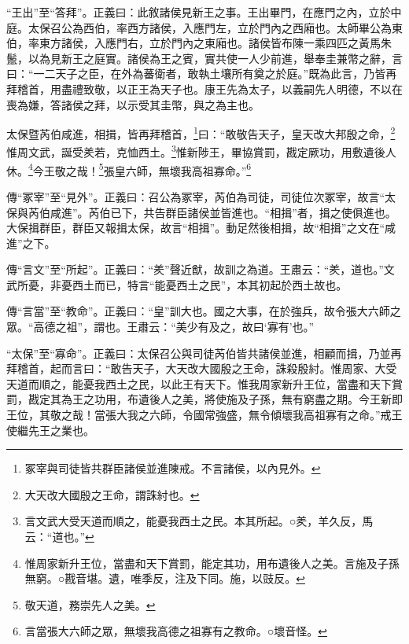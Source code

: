 {\noindent\shu{}\fzkt “王出”至“答拜”。正義曰：此敘諸侯見新王之事。王出畢門，在應門之內，立於中庭。太保召公為西伯，率西方諸侯，入應門左，立於門內之西廂也。太師畢公為東伯，率東方諸侯，入應門右，立於門內之東廂也。諸侯皆布陳一乘四匹之黃馬朱鬛，以為見新王之庭實。諸侯為王之賓，實共使一人少前進，舉奉圭兼幣之辭，言曰：“一二天子之臣，在外為蕃衛者，敢執土壤所有奠之於庭。”既為此言，乃皆再拜稽首，用盡禮致敬，以正王為天子也。康王先為太子，以義嗣先人明德，不以在喪為嫌，答諸侯之拜，以示受其圭幣，與之為主也。 \par}

太保暨芮伯咸進，相揖，皆再拜稽首，\footnote{冢宰與司徒皆共群臣諸侯並進陳戒。不言諸侯，以內見外。}曰：“敢敬告天子，皇天改大邦殷之命，\footnote{大天改大國殷之王命，謂誅紂也。}惟周文武，誕受羑若，克恤西土。\footnote{言文武大受天道而順之，能憂我西土之民。本其所起。○羑，羊久反，馬云：“道也。”}惟新陟王，畢協賞罰，戡定厥功，用敷遺後人休。\footnote{惟周家新升王位，當盡和天下賞罰，能定其功，用布遺後人之美。言施及子孫無窮。○戡音堪。遺，唯季反，注及下同。施，以豉反。}今王敬之哉！\footnote{敬天道，務崇先人之美。}張皇六師，無壞我高祖寡命。”\footnote{言當張大六師之眾，無壞我高德之祖寡有之教命。○壞音怪。}


{\noindent\zhuan{}\fzbyks 傳“冢宰”至“見外”。正義曰：召公為冢宰，芮伯為司徒，司徒位次冢宰，故言“太保與芮伯咸進”。芮伯已下，共告群臣諸侯並皆進也。“相揖”者，揖之使俱進也。大保揖群臣，群臣又報揖太保，故言“相揖”。動足然後相揖，故“相揖”之文在“咸進”之下。 \par}

{\noindent\zhuan{}\fzbyks 傳“言文”至“所起”。正義曰：“羑”聲近猷，故訓之為道。王肅云：“羑，道也。”文武所憂，非憂西土而已，特言“能憂西土之民”，本其初起於西土故也。 \par}

{\noindent\zhuan{}\fzbyks 傳“言當”至“教命”。正義曰：“皇”訓大也。國之大事，在於強兵，故令張大六師之眾。“高德之祖”，謂也。王肅云：“美少有及之，故曰‘寡有’也。” \par}

{\noindent\shu{}\fzkt “太保”至“寡命”。正義曰：太保召公與司徒芮伯皆共諸侯並進，相顧而揖，乃並再拜稽首，起而言曰：“敢告天子，大天改大國殷之王命，誅殺殷紂。惟周家、大受天道而順之，能憂我西土之民，以此王有天下。惟我周家新升王位，當盡和天下賞罰，戡定其為王之功用，布遺後人之美，將使施及子孫，無有窮盡之期。今王新即王位，其敬之哉！當張大我之六師，令國常強盛，無令傾壞我高祖寡有之命。”戒王使繼先王之業也。 \par}

